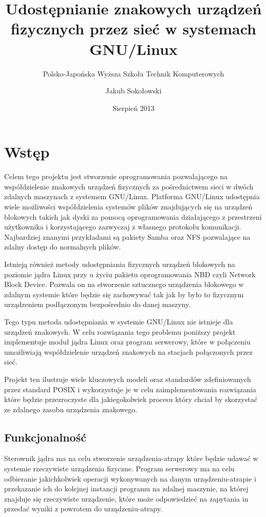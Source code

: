 \documentclass[10pt]{scrartcl}
\title{Udostępnianie znakowych urządzeń fizycznych przez sieć w systemach GNU/Linux}
\subtitle{Polsko-Japońska Wyższa Szkoła Technik Komputerowych}
\author{Jakub Sokołowski}
\date{Sierpień 2013}
\begin{document}
\newpage
\section{Wstęp}
\label{abstract}

Celem tego projektu jest stworzenie oprogramowania pozwalającego na współdzielenie znakowych urządzeń fizycznych za pośrednictwem sieci w dwóch zdalnych maszynach z systemem GNU/Linux. Platforma GNU/Linux udostępnia wiele możliwości współdzielenia systemów plików znajdujących się na urządzeń blokowych takich jak dyski za pomocą oprogramowania działającego z przestrzeni użytkownika i korzystającego zazwyczaj z własnego protokołu komunikacji. Najbardziej znanymi przykładami są pakiety Samba oraz NFS pozwalające na zdalny dostęp do normalnych plików.


Istnieją również metody udostępniania fizycznych urządzeń blokowych na poziomie jądra Linux przy u życiu pakietu oprogramowania NBD czyli Network Block Device. Pozwala on na stworzenie sztucznego urządzenia blokowego w zdalnym systemie które będzie się zachowywać tak jak by było to fizycznym urządzeniem podłączonym bezpośrednio do danej maszyny.

Tego typu metoda udostępniania w systemie GNU/Linux nie istnieje dla urządzeń znakowych. W celu rozwiązania tego problemu poniższy projekt implementuje moduł jądra Linux oraz program serwerowy, które w połączeniu umożliwiają współdzielenie urządzeń znakowych na stacjach połączonych przez sieć.

Projekt ten ilustruje wiele kluczowych modeli oraz standardów zdefiniowanych przez standard POSIX i wykorzystuje je w celu zaimplementowania rozwiązania które będzie przezroczyste dla jakiegokolwiek procesu który chciał by skorzystać ze zdalnego zasobu urządzenia znakowego.

\subsection{Funkcjonalność}
\label{functionality}

Sterownik jądra ma na celu stworzenie urządzenia-atrapy które będzie udawać w systemie rzeczywiste urządzenia fizyczne. Program serwerowy ma na celu odbieranie jakichkolwiek operacji wykonywanych na danym urządzeniu-atrapie i przekazanie ich do kolejnej instancji programu na zdalnej maszynie, na której znajduje się rzeczywiste urządzenie, które może odpowiedzieć na zapytania in przesłać wyniki z powrotem do urządzeniu-atrapy.
\end{document}
